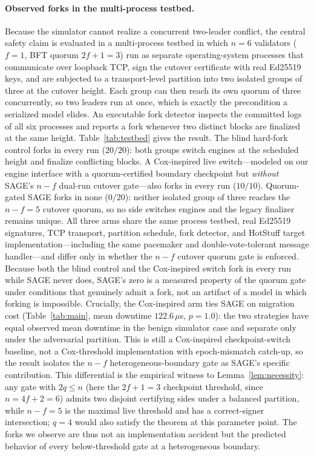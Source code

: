 \documentclass[journal]{IEEEtran}
\theoremstyle{definition}
\theoremstyle{remark}
\begin{document}
\paragraph{Observed forks in the multi-process testbed.}
Because the simulator cannot realize a concurrent two-leader conflict, the central safety claim
is evaluated in a multi-process testbed in which $n{=}6$ validators ($f{=}1$, BFT quorum
$2f{+}1{=}3$) run as separate operating-system processes that communicate over loopback TCP, sign
the cutover certificate with real Ed25519 keys, and are subjected to a transport-level partition
into two isolated groups of three at the cutover height. Each group can then reach its own quorum
of three concurrently, so two leaders run at once, which is exactly the precondition a serialized
model elides. An executable fork detector inspects the committed logs of all six processes and
reports a fork whenever two distinct blocks are finalized at the same height. Table~\ref{tab:testbed}
gives the result. The blind hard-fork control forks in
every run ($20/20$): both groups switch engines at the scheduled height and finalize conflicting
blocks. A Cox-inspired live switch---modeled on our engine interface with a quorum-certified
boundary checkpoint but \emph{without} SAGE's $n{-}f$ dual-run cutover gate---also forks in every
run ($10/10$). Quorum-gated SAGE forks in none ($0/20$): neither isolated group of three reaches
the $n{-}f{=}5$ cutover quorum, so no side switches engines and the legacy finalizer remains
unique. All three arms share the same process testbed, real Ed25519 signatures, TCP transport,
partition schedule, fork detector, and HotStuff target implementation---including the same
pacemaker and double-vote-tolerant message handler---and differ only in whether the $n{-}f$
cutover quorum gate is enforced. Because both the blind control and the Cox-inspired switch fork
in every run while SAGE never does, SAGE's zero is a measured property of the quorum gate under
conditions that genuinely admit a fork, not an artifact of a model in which forking is impossible.
Crucially, the Cox-inspired arm ties SAGE on migration cost (Table~\ref{tab:main}, mean downtime
$122.6\,\mu$s, $p=1.0$): the two strategies have equal observed mean downtime in the benign simulator case and separate
only under the adversarial partition. This is still a Cox-inspired checkpoint-switch baseline, not
a Cox-threshold implementation with epoch-mismatch catch-up, so the result isolates the $n{-}f$
heterogeneous-boundary gate as SAGE's specific contribution. This differential is the empirical
witness to Lemma~\ref{lem:necessity}: any gate with $2q\le n$ (here the $2f{+}1{=}3$ checkpoint
threshold, since $n=4f+2=6$) admits two disjoint certifying sides under a balanced partition, while
$n{-}f{=}5$ is the maximal live threshold and has a correct-signer intersection; $q{=}4$ would also satisfy the theorem at this parameter point. The forks we observe are thus not an implementation accident but the predicted behavior of
every below-threshold gate at a heterogeneous boundary.
\end{document}
